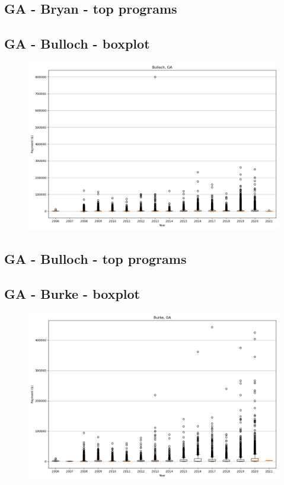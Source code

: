 \subsection*{GA - Bryan - top programs}

\newpage
\subsection*{GA - Bulloch - boxplot}
\begin{figure}[h]
\centering
\includegraphics[width=7in]{../output/boxplots/counties/Bulloch-GA_boxplot.png}
\end{figure}


\subsection*{GA - Bulloch - top programs}

\newpage
\subsection*{GA - Burke - boxplot}
\begin{figure}[h]
\centering
\includegraphics[width=7in]{../output/boxplots/counties/Burke-GA_boxplot.png}
\end{figure}


